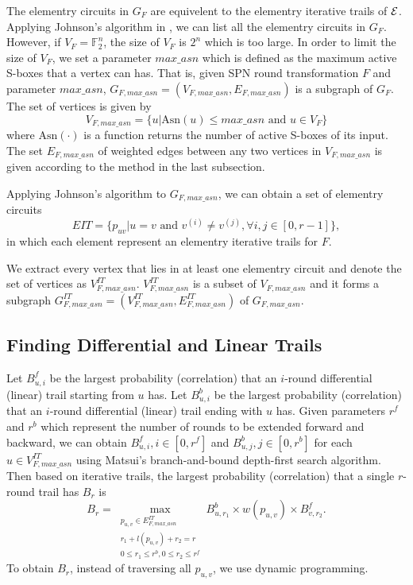 The elementry circuits in $G_F$ are equivelent to the elementry iterative trails of $\mathcal{E}$. Applying Johnson's algorithm in \cite{J75}, we can list all the elementry circuits in $G_F$. However, if $V_F=\mathbb{F}_2^n$, the size of $V_F$ is $2^n$ which is too large. In order to limit the size of $V_F$, we set a parameter $max\_asn$ which is defined as the maximum active S-boxes that a vertex can has. That is, given SPN round transformation $F$ and parameter $max\_asn$, $G_{F,max\_asn}=(V_{F,max\_asn},E_{F,max\_asn})$ is a subgraph of $G_F$. The set of vertices is given by
\[
    V_{F,max\_asn}=\{u|\text{Asn}(u)\leq max\_asn \text{ and } u\in V_F\}
\]
where $\text{Asn}(\cdot)$ is a function returns the number of active S-boxes of its input. The set $E_{F,max\_asn}$ of weighted edges between any two vertices in $V_{F,max\_asn}$ is given according to the method in the last subsection. 

Applying Johnson's algorithm to $G_{F,max\_asn}$, we can obtain a set of elementry circuits
\[
    EIT=\{p_{uv}|u=v \text{ and } v^{(i)}\neq v^{(j)},\forall i,j\in[0,r-1]\},
\]
in which each element represent an elementry iterative trails for $F$. 

We extract every vertex that lies in at least one elementry circuit and denote the set of vertices as $V^{IT}_{F,max\_asn}$. $V^{IT}_{F,max\_asn}$ is a subset of $V_{F,max\_asn}$ and it forms a subgraph $G^{IT}_{F,max\_asn}=(V^{IT}_{F,max\_asn},E^{IT}_{F,max\_asn})$ of $G_{F,max\_asn}$. 

\subsection{Finding Differential and Linear Trails}

Let $B^f_{u,i}$ be the largest probability (correlation) that an $i$-round differential (linear) trail starting from $u$ has. Let $B^b_{u,i}$ be the largest probability (correlation) that an $i$-round differential (linear) trail ending with $u$ has. Given parameters $r^f$ and $r^b$ which represent the number of rounds to be extended forward and backward, we can obtain $B^f_{u,i},i\in [0,r^f]$ and $B^b_{u,j},j\in [0,r^b]$ for each $u\in V^{IT}_{F,max\_asn}$ using Matsui's branch-and-bound depth-first search algorithm. Then based on iterative trails, the largest probability (correlation) that a single $r$-round trail has $B_r$ is
\[
    B_r=\max\limits_{\substack{p_{u,v}\in E^{IT}_{F,max\_asn}\\r_1+l(p_{u,v})+r_2=r\\0\leq r_1\leq r^b,0\leq r_2\leq r^f}} B^b_{u,r_1}\times w(p_{u,v})\times B^f_{v,r_2}.
\]
To obtain $B_r$, instead of traversing all $p_{u,v}$, we use dynamic programming. 

